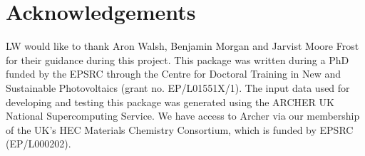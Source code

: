 \section{Acknowledgements}
\label{sec:Acknowledgements}

LW would like to thank Aron Walsh, Benjamin Morgan and Jarvist Moore Frost for their guidance during this project. This package was written during a PhD funded by the EPSRC through the Centre for Doctoral Training in New and Sustainable Photovoltaics (grant no. EP/L01551X/1). The input data used for developing and testing this package was generated using the ARCHER UK National Supercomputing Service. We have access to Archer via our membership of the UK's HEC Materials Chemistry Consortium, which is funded by EPSRC (EP/L000202).


